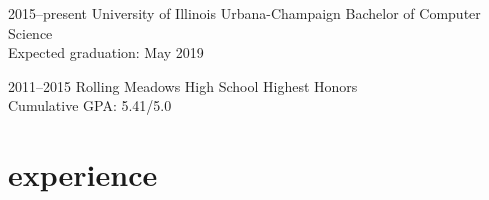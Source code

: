 \documentclass[]{resume}
\begin{document}
\begin{entrylist}


\entry
{2015--present}
{University of Illinois Urbana-Champaign}
{}
{Bachelor of Computer Science \\
Expected graduation: May 2019}


\entry
{2011--2015}
{Rolling Meadows High School}
{}
{Highest Honors \\
Cumulative GPA: 5.41/5.0}


\end{entrylist}


\section{experience}

\end{document}
